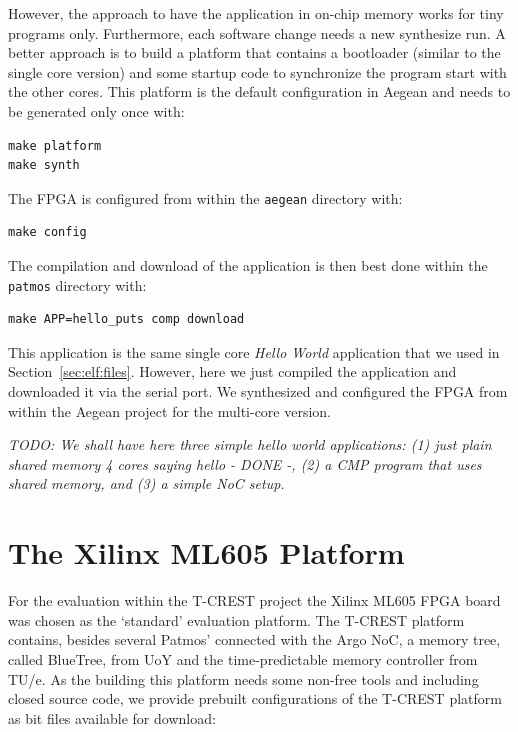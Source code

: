 \documentclass[a4paper,fontsize=10pt,twoside,DIV15,BCOR12mm,headinclude=true,footinclude=false,pagesize,bibtotoc]{scrbook}
\newcommand{\code}[1]{{\texttt{#1}}}
\newcommand{\todo}[1]{{\emph{TODO: #1}}}
\begin{document}
However, the approach to have the application in on-chip memory works for tiny programs
only. Furthermore, each software change needs a new synthesize run. A better approach is
to build a platform that contains a bootloader (similar to the single core version) and some
startup code to synchronize the program start with the other cores. This platform is the default
configuration in Aegean and needs to be generated only once with:

\begin{verbatim}
make platform
make synth
\end{verbatim}

The FPGA is configured from within the \code{aegean} directory with:

\begin{verbatim}
make config
\end{verbatim}

The compilation and download of the application is then best done within
the \code{patmos} directory with:

\begin{verbatim}
make APP=hello_puts comp download
\end{verbatim}

This application is the same single core \emph{Hello World} application that
we used in Section~\ref{sec:elf:files}. However, here we just compiled the
application and downloaded it via the serial port. We synthesized and configured
the FPGA from within the Aegean project for the multi-core version.

\todo{We shall have here three simple hello world applications: (1) just plain shared memory 4 cores saying hello - DONE -,
(2) a CMP program that uses shared memory, and (3) a simple NoC setup.}



\section{The Xilinx ML605 Platform}

For the evaluation within the T-CREST project the Xilinx ML605 FPGA board was chosen as the `standard'
evaluation platform. The T-CREST platform contains, besides several Patmos' connected with the Argo NoC,
a memory tree, called BlueTree, from UoY and the time-predictable memory controller from TU/e. As the
building this platform needs some non-free tools and including closed source code, we provide prebuilt
configurations of the T-CREST platform as bit files available for download:
\end{document}
